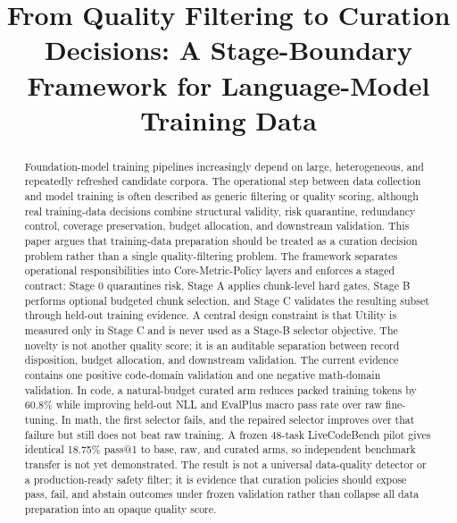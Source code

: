 \documentclass[conference]{IEEEtran}
\begin{document}
\title{From Quality Filtering to Curation Decisions: A Stage-Boundary Framework for Language-Model Training Data}

\author{
\and
{}
}

\maketitle

\begin{abstract}
Foundation-model training pipelines increasingly depend on large,
heterogeneous, and repeatedly refreshed candidate corpora.  The operational
step between data collection and model training is often described as generic
filtering or quality scoring, although real training-data decisions combine
structural validity, risk quarantine, redundancy control, coverage
preservation, budget allocation, and downstream validation.  This paper argues
that training-data preparation should be treated as a curation decision
problem rather than a single quality-filtering problem.  The framework
separates operational responsibilities into Core-Metric-Policy layers and
enforces a staged contract:
Stage 0 quarantines risk, Stage A applies chunk-level hard gates, Stage B
performs optional budgeted chunk selection, and Stage C validates the resulting
subset through held-out training evidence.  A central design constraint is that
Utility is measured only in Stage C and is never used as a Stage-B selector
objective.  The novelty is not another quality score; it is an auditable
separation between record disposition, budget allocation, and downstream
validation.  The current evidence contains one positive code-domain validation
and one negative math-domain validation.  In code, a natural-budget curated
arm reduces packed training tokens by 60.8\% while improving held-out NLL and
EvalPlus macro pass rate over raw fine-tuning.  In math, the first selector
fails, and the repaired selector improves over that failure but still does not
beat raw training.  A frozen 48-task LiveCodeBench pilot gives identical
18.75\% pass@1 to base, raw, and curated arms, so independent benchmark
transfer is not yet demonstrated.  The result is not a universal data-quality detector or a
production-ready safety filter; it is evidence that curation policies should
expose pass, fail, and abstain outcomes under frozen validation rather than
collapse all data preparation into an opaque quality score.
\end{abstract}
\end{document}
